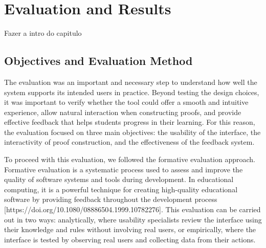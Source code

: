 %

\chapter{Evaluation and Results}
\label{chap:results_eval}

Fazer a intro do capitulo 

\section{Objectives and Evaluation Method}

The evaluation was an important and necessary step to understand how well the system supports its intended users in practice. Beyond testing the design choices, it was important to verify whether the tool could offer a smooth and intuitive experience, allow natural interaction when constructing proofs, and provide effective feedback that helps students progress in their learning. For this reason, the evaluation focused on three main objectives: the usability of the interface, the interactivity of proof construction, and the effectiveness of the feedback system.

To proceed with this evaluation, we followed the formative evaluation approach. Formative evaluation is a systematic process used to assess and improve the quality of software systems and tools during development. In educational computing, it is a powerful technique for creating high-quality educational software by providing feedback throughout the development process [https://doi.org/10.1080/08886504.1999.10782276]. This evaluation can be carried out in two ways: analytically, where usability specialists review the interface using their knowledge and rules without involving real users, or empirically, where the interface is tested by observing real users and collecting data from their actions.

